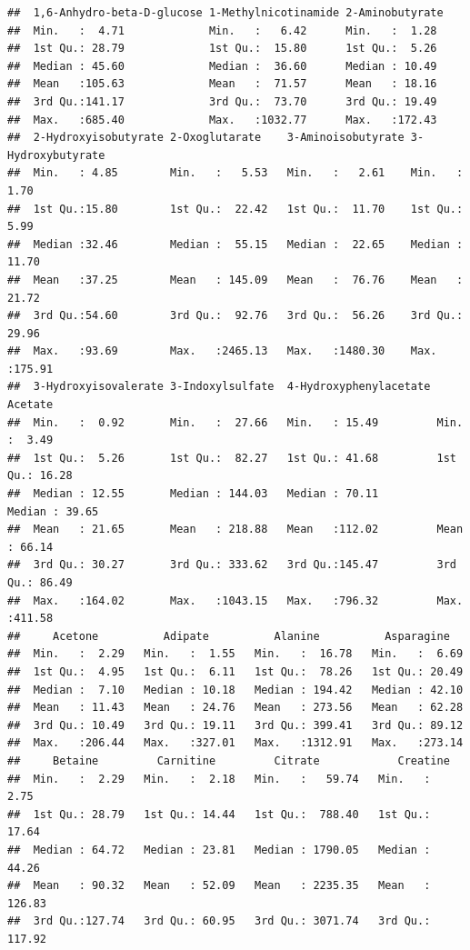 \documentclass[
]{article}
\begin{document}
\begin{verbatim}
##  1,6-Anhydro-beta-D-glucose 1-Methylnicotinamide 2-Aminobutyrate 
##  Min.   :  4.71             Min.   :   6.42      Min.   :  1.28  
##  1st Qu.: 28.79             1st Qu.:  15.80      1st Qu.:  5.26  
##  Median : 45.60             Median :  36.60      Median : 10.49  
##  Mean   :105.63             Mean   :  71.57      Mean   : 18.16  
##  3rd Qu.:141.17             3rd Qu.:  73.70      3rd Qu.: 19.49  
##  Max.   :685.40             Max.   :1032.77      Max.   :172.43  
##  2-Hydroxyisobutyrate 2-Oxoglutarate    3-Aminoisobutyrate 3-Hydroxybutyrate
##  Min.   : 4.85        Min.   :   5.53   Min.   :   2.61    Min.   :  1.70   
##  1st Qu.:15.80        1st Qu.:  22.42   1st Qu.:  11.70    1st Qu.:  5.99   
##  Median :32.46        Median :  55.15   Median :  22.65    Median : 11.70   
##  Mean   :37.25        Mean   : 145.09   Mean   :  76.76    Mean   : 21.72   
##  3rd Qu.:54.60        3rd Qu.:  92.76   3rd Qu.:  56.26    3rd Qu.: 29.96   
##  Max.   :93.69        Max.   :2465.13   Max.   :1480.30    Max.   :175.91   
##  3-Hydroxyisovalerate 3-Indoxylsulfate  4-Hydroxyphenylacetate    Acetate      
##  Min.   :  0.92       Min.   :  27.66   Min.   : 15.49         Min.   :  3.49  
##  1st Qu.:  5.26       1st Qu.:  82.27   1st Qu.: 41.68         1st Qu.: 16.28  
##  Median : 12.55       Median : 144.03   Median : 70.11         Median : 39.65  
##  Mean   : 21.65       Mean   : 218.88   Mean   :112.02         Mean   : 66.14  
##  3rd Qu.: 30.27       3rd Qu.: 333.62   3rd Qu.:145.47         3rd Qu.: 86.49  
##  Max.   :164.02       Max.   :1043.15   Max.   :796.32         Max.   :411.58  
##     Acetone          Adipate          Alanine          Asparagine    
##  Min.   :  2.29   Min.   :  1.55   Min.   :  16.78   Min.   :  6.69  
##  1st Qu.:  4.95   1st Qu.:  6.11   1st Qu.:  78.26   1st Qu.: 20.49  
##  Median :  7.10   Median : 10.18   Median : 194.42   Median : 42.10  
##  Mean   : 11.43   Mean   : 24.76   Mean   : 273.56   Mean   : 62.28  
##  3rd Qu.: 10.49   3rd Qu.: 19.11   3rd Qu.: 399.41   3rd Qu.: 89.12  
##  Max.   :206.44   Max.   :327.01   Max.   :1312.91   Max.   :273.14  
##     Betaine         Carnitine         Citrate            Creatine      
##  Min.   :  2.29   Min.   :  2.18   Min.   :   59.74   Min.   :   2.75  
##  1st Qu.: 28.79   1st Qu.: 14.44   1st Qu.:  788.40   1st Qu.:  17.64  
##  Median : 64.72   Median : 23.81   Median : 1790.05   Median :  44.26  
##  Mean   : 90.32   Mean   : 52.09   Mean   : 2235.35   Mean   : 126.83  
##  3rd Qu.:127.74   3rd Qu.: 60.95   3rd Qu.: 3071.74   3rd Qu.: 117.92  

\end{verbatim}
\end{document}
